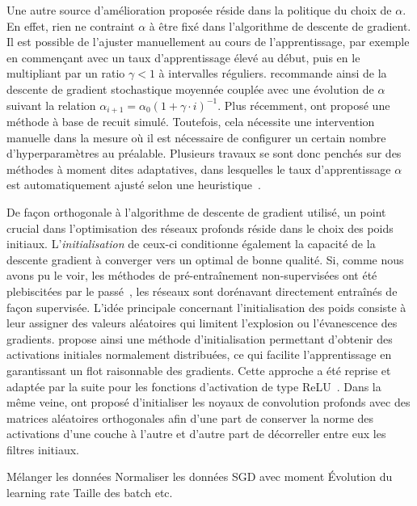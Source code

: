 Une autre source d'amélioration proposée réside dans la politique du choix de $\alpha$. En effet, rien ne contraint $\alpha$ à être fixé dans l'algorithme de descente de gradient. Il est possible de l'ajuster manuellement au cours de l'apprentissage, par exemple en commençant avec un taux d'apprentissage élevé au début, puis en le multipliant par un ratio $\gamma < 1$ à intervalles réguliers. \citet{bottou_stochastic_2012} recommande ainsi de la descente de gradient stochastique moyennée couplée avec une évolution de $\alpha$ suivant la relation $\alpha_{i+1} = \alpha_0 (1 + \gamma \cdot i)^{-1}$. Plus récemment, \citet{loshchilov_sgdr_2016} ont proposé une méthode à base de recuit simulé. Toutefois, cela nécessite une intervention manuelle dans la mesure où il est nécessaire de configurer un certain nombre d'hyperparamètres au préalable. Plusieurs travaux se sont donc penchés sur des méthodes à moment dites adaptatives, dans lesquelles le taux d'apprentissage $\alpha$ est automatiquement ajusté selon une heuristique~\cite{duchi_adaptive_2011,tielman_lecture_2012,zeiler_adadelta_2012,kingma_adam_2014}.

De façon orthogonale à l'algorithme de descente de gradient utilisé, un point crucial dans l'optimisation des réseaux profonds réside dans le choix des poids initiaux. L'\emph{initialisation} de ceux-ci conditionne également la capacité de la descente gradient à converger vers un optimal de bonne qualité. Si, comme nous avons pu le voir, les méthodes de pré-entraînement non-supervisées ont été plebiscitées par le passé~\cite{hinton_fast_2006,bengio_greedy_2007}, les réseaux sont dorénavant directement entraînés de façon supervisée. L'idée principale concernant l'initialisation des poids consiste à leur assigner des valeurs aléatoires qui limitent l'explosion ou l'évanescence des gradients. \citet{glorot_understanding_2010-1} propose ainsi une méthode d'initialisation permettant d'obtenir des activations initiales normalement distribuées, ce qui facilite l'apprentissage en garantissant un flot raisonnable des gradients. Cette approche a été reprise et adaptée par la suite pour les fonctions d'activation de type \gls{ReLU}~\cite{he_delving_2015}. Dans la même veine, \citet{saxe_exact_2013} ont proposé d'initialiser les noyaux de convolution profonds avec des matrices aléatoires orthogonales afin d'une part de conserver la norme des activations d'une couche à l'autre et d'autre part de décorreller entre eux les filtres initiaux.

Mélanger les données
Normaliser les données
SGD avec moment
Évolution du learning rate
Taille des batch
etc.

